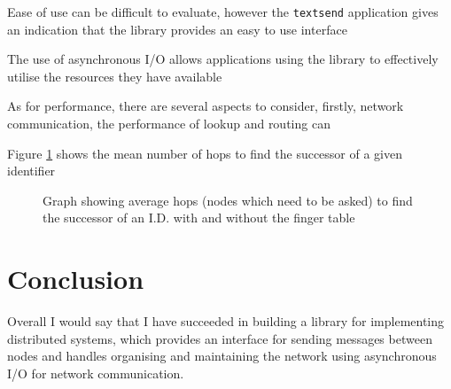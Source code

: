 \documentclass{article}
\begin{document}
Ease of use can be difficult to evaluate, however the \texttt{textsend} application gives an indication that the library provides an easy to use interface

The use of asynchronous I/O allows applications using the library to effectively utilise the resources they have available


As for performance, there are several aspects to consider, firstly, network communication, the performance of lookup and routing can 

Figure \ref{fig:fingerperf} shows the mean number of hops to find the successor of a given identifier

\begin{figure}
\begin{center}
\end{center}
\caption{Graph showing average hops (nodes which need to be asked) to find the successor of an I.D. with and without the finger table}
\label{fig:fingerperf}
\end{figure}




\section{Conclusion}

Overall I would say that I have succeeded in building a library for implementing distributed systems, which provides an interface for sending messages between nodes and handles organising and maintaining the network using asynchronous I/O for network communication.
\end{document}
